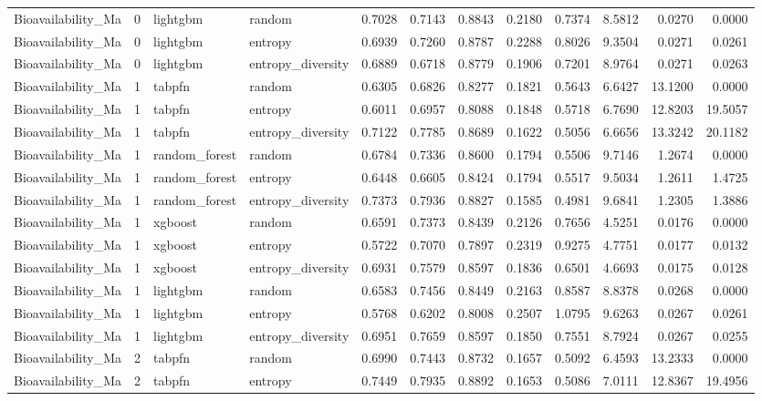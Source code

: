 \begin{tabular}{lrllrrrrrrrr}
Bioavailability_Ma & 0 & lightgbm & random & 0.7028 & 0.7143 & 0.8843 & 0.2180 & 0.7374 & 8.5812 & 0.0270 & 0.0000 \\
Bioavailability_Ma & 0 & lightgbm & entropy & 0.6939 & 0.7260 & 0.8787 & 0.2288 & 0.8026 & 9.3504 & 0.0271 & 0.0261 \\
Bioavailability_Ma & 0 & lightgbm & entropy_diversity & 0.6889 & 0.6718 & 0.8779 & 0.1906 & 0.7201 & 8.9764 & 0.0271 & 0.0263 \\
Bioavailability_Ma & 1 & tabpfn & random & 0.6305 & 0.6826 & 0.8277 & 0.1821 & 0.5643 & 6.6427 & 13.1200 & 0.0000 \\
Bioavailability_Ma & 1 & tabpfn & entropy & 0.6011 & 0.6957 & 0.8088 & 0.1848 & 0.5718 & 6.7690 & 12.8203 & 19.5057 \\
Bioavailability_Ma & 1 & tabpfn & entropy_diversity & 0.7122 & 0.7785 & 0.8689 & 0.1622 & 0.5056 & 6.6656 & 13.3242 & 20.1182 \\
Bioavailability_Ma & 1 & random_forest & random & 0.6784 & 0.7336 & 0.8600 & 0.1794 & 0.5506 & 9.7146 & 1.2674 & 0.0000 \\
Bioavailability_Ma & 1 & random_forest & entropy & 0.6448 & 0.6605 & 0.8424 & 0.1794 & 0.5517 & 9.5034 & 1.2611 & 1.4725 \\
Bioavailability_Ma & 1 & random_forest & entropy_diversity & 0.7373 & 0.7936 & 0.8827 & 0.1585 & 0.4981 & 9.6841 & 1.2305 & 1.3886 \\
Bioavailability_Ma & 1 & xgboost & random & 0.6591 & 0.7373 & 0.8439 & 0.2126 & 0.7656 & 4.5251 & 0.0176 & 0.0000 \\
Bioavailability_Ma & 1 & xgboost & entropy & 0.5722 & 0.7070 & 0.7897 & 0.2319 & 0.9275 & 4.7751 & 0.0177 & 0.0132 \\
Bioavailability_Ma & 1 & xgboost & entropy_diversity & 0.6931 & 0.7579 & 0.8597 & 0.1836 & 0.6501 & 4.6693 & 0.0175 & 0.0128 \\
Bioavailability_Ma & 1 & lightgbm & random & 0.6583 & 0.7456 & 0.8449 & 0.2163 & 0.8587 & 8.8378 & 0.0268 & 0.0000 \\
Bioavailability_Ma & 1 & lightgbm & entropy & 0.5768 & 0.6202 & 0.8008 & 0.2507 & 1.0795 & 9.6263 & 0.0267 & 0.0261 \\
Bioavailability_Ma & 1 & lightgbm & entropy_diversity & 0.6951 & 0.7659 & 0.8597 & 0.1850 & 0.7551 & 8.7924 & 0.0267 & 0.0255 \\
Bioavailability_Ma & 2 & tabpfn & random & 0.6990 & 0.7443 & 0.8732 & 0.1657 & 0.5092 & 6.4593 & 13.2333 & 0.0000 \\
Bioavailability_Ma & 2 & tabpfn & entropy & 0.7449 & 0.7935 & 0.8892 & 0.1653 & 0.5086 & 7.0111 & 12.8367 & 19.4956 \\

\end{tabular}
